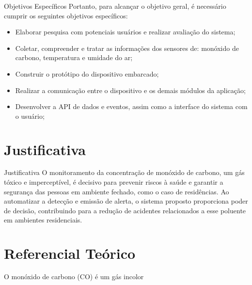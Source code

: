 \documentclass[12pt]{beamer}
\begin{document}
    \begin{frame}{Objetivos Específicos}
        Portanto, para alcançar o objetivo geral, é necessário cumprir os seguintes objetivos específicos:
        \begin{itemize}
            \item Elaborar pesquisa com potenciais usuários e realizar avaliação do sistema;
            \item Coletar, compreender e tratar as informações dos sensores de: monóxido de carbono, temperatura e umidade do ar;
            \item Construir o protótipo do dispositivo embarcado;
            \item Realizar a comunicação entre o dispositivo e os demais módulos da aplicação;
            \item Desenvolver a API de dados e eventos, assim como a interface do sistema com o usuário;
        \end{itemize} 
    \end{frame}

    \section{Justificativa}

    \begin{frame}{Justificativa}
        O monitoramento da concentração de monóxido de carbono, um gás tóxico e imperceptível, é decisivo para prevenir riscos 
        à saúde e garantir a segurança das pessoas em ambiente fechado, como o caso de residências. Ao automatizar a detecção e 
        emissão de alerta, o sistema proposto proporciona poder de decisão, contribuindo para a redução de acidentes
        relacionados a esse poluente em ambientes residenciais.   
    \end{frame}

    \section{Referencial Teórico}

    \begin{frame}
        O monóxido de carbono (CO) é um gás incolor 
    \end{frame}
\end{document}
